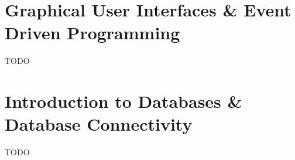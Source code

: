 
\chapter{Graphical User Interfaces \& Event Driven Programming}
\label{chapter:gui}

TODO

\chapter{Introduction to Databases \& Database Connectivity}

TODO

